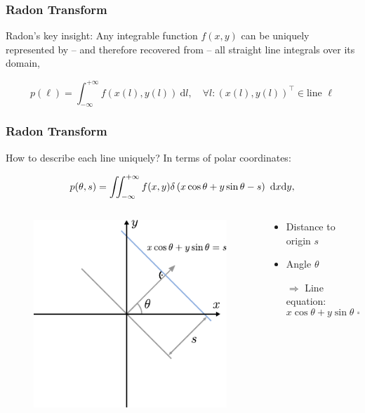 \begin{frame}
	\frametitle{Radon Transform}

	Radon's key insight: Any integrable function $f(x,y)$ can be uniquely represented by -- and therefore recovered from -- all straight line integrals over its domain,

	\begin{equation}
		\label{eqn:ct_radon_1}
		p(\ell) = \int_{-\infty}^{+\infty} f\left(x\left(l\right), y\left(l\right)\right) \ \text{d}l, \quad \forall l: \left(x\left(l\right), y\left(l\right)\right)^\top \in \text{line } \ell
	\end{equation}

\end{frame}



\begin{frame}
	\frametitle{Radon Transform}
	How to describe each line uniquely? In terms of polar coordinates:

	\begin{equation}
		\label{eqn:ct_radon_2}
		p(\theta, s) =\iint_{-\infty}^{+\infty} f(x,y) \delta\left(x \cos \theta + y \sin \theta - s\right) \ \textnormal{d}x\textnormal{d}y,
	\end{equation}

	\begin{columns}[c, onlytextwidth]
		\begin{column}{0.5\textwidth}
			\begin{figure}[tbp]
				\centering
				\includegraphics[height=0.6\textheight]{images/radon_1}%
				\label{fig:ct_radon_1}
			\end{figure}
		\end{column}\begin{column}{0.5\textwidth}
			\begin{itemize}
				\setlength\itemsep{0.3cm}
				\item Distance to origin $s$
				\item Angle $\theta$
				\item[$\Rightarrow$] Line equation:
				      \begin{equation}
					      x \cos{\theta} + y \sin{\theta} = s
				      \end{equation}
			\end{itemize}
		\end{column}
	\end{columns}


\end{frame}
